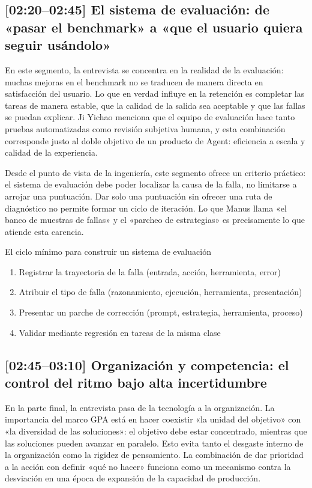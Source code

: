 \documentclass[a4paper]{article}
\begin{document}
\subsection{[02:20--02:45] El sistema de evaluación: de «pasar el benchmark» a «que el usuario quiera seguir usándolo»}

En este segmento, la entrevista se concentra en la realidad de la evaluación: muchas mejoras en el benchmark no se traducen de manera directa en satisfacción del usuario. Lo que en verdad influye en la retención es completar las tareas de manera estable, que la calidad de la salida sea aceptable y que las fallas se puedan explicar. Ji Yichao menciona que el equipo de evaluación hace tanto pruebas automatizadas como revisión subjetiva humana, y esta combinación corresponde justo al doble objetivo de un producto de Agent: eficiencia a escala y calidad de la experiencia.

Desde el punto de vista de la ingeniería, este segmento ofrece un criterio práctico: el sistema de evaluación debe poder localizar la causa de la falla, no limitarse a arrojar una puntuación. Dar solo una puntuación sin ofrecer una ruta de diagnóstico no permite formar un ciclo de iteración. Lo que Manus llama «el banco de muestras de fallas» y el «parcheo de estrategias» es precisamente lo que atiende esta carencia.

\begin{importantbox}{El ciclo mínimo para construir un sistema de evaluación}
\begin{enumerate}
    \item Registrar la trayectoria de la falla (entrada, acción, herramienta, error)
    \item Atribuir el tipo de falla (razonamiento, ejecución, herramienta, presentación)
    \item Presentar un parche de corrección (prompt, estrategia, herramienta, proceso)
    \item Validar mediante regresión en tareas de la misma clase
\end{enumerate}
\end{importantbox}

\subsection{[02:45--03:10] Organización y competencia: el control del ritmo bajo alta incertidumbre}

En la parte final, la entrevista pasa de la tecnología a la organización. La importancia del marco GPA está en hacer coexistir «la unidad del objetivo» con «la diversidad de las soluciones»: el objetivo debe estar concentrado, mientras que las soluciones pueden avanzar en paralelo. Esto evita tanto el desgaste interno de la organización como la rigidez de pensamiento. La combinación de dar prioridad a la acción con definir «qué no hacer» funciona como un mecanismo contra la desviación en una época de expansión de la capacidad de producción.
\end{document}

